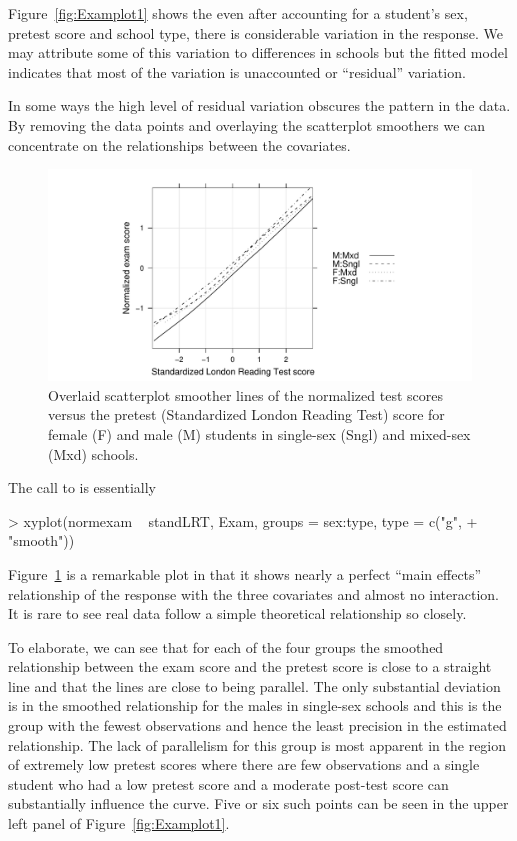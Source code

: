 \documentclass[12pt]{article}
\begin{document}
Figure~\ref{fig:Examplot1} shows the even after accounting for a
student's sex, pretest score and school type, there is considerable
variation in the response.  We may attribute some of this variation to
differences in schools but the fitted model indicates that most of the
variation is unaccounted or ``residual'' variation.

In some ways the high level of residual variation obscures the pattern
in the data.  By removing the data points and overlaying the
scatterplot smoothers we can concentrate on the relationships between
the covariates.
\begin{figure}[tbp]
  \centering
  \includegraphics[width=\textwidth]{figs/SoftRev-Examplot2}
  \caption{Overlaid scatterplot smoother lines of the normalized test
    scores versus the pretest (Standardized London Reading Test) score
    for female (F) and male (M) students in single-sex (Sngl) and
    mixed-sex (Mxd) schools.}
  \label{fig:Examplot2}
\end{figure}
The call to  is essentially
\begin{Schunk}
\begin{Sinput}
> xyplot(normexam ~ standLRT, Exam, groups = sex:type, type = c("g", 
+     "smooth"))
\end{Sinput}
\end{Schunk}

Figure~\ref{fig:Examplot2} is a remarkable plot in that it shows
nearly a perfect ``main effects'' relationship of the response with
the three covariates and almost no interaction.  It is rare to see
real data follow a simple theoretical relationship so closely.

To elaborate, we can see that for each of the four groups the smoothed
relationship between the exam score and the pretest score is close to
a straight line and that the lines are close to being parallel.  The
only substantial deviation is in the smoothed relationship for the
males in single-sex schools and this is the group with the fewest
observations and hence the least precision in the estimated
relationship.  The lack of parallelism for this group is most apparent
in the region of extremely low pretest scores where there are few
observations and a single student who had a low pretest score and a
moderate post-test score can substantially influence the curve.  Five
or six such points can be seen in the upper left panel of
Figure~\ref{fig:Examplot1}. 
\end{document}
